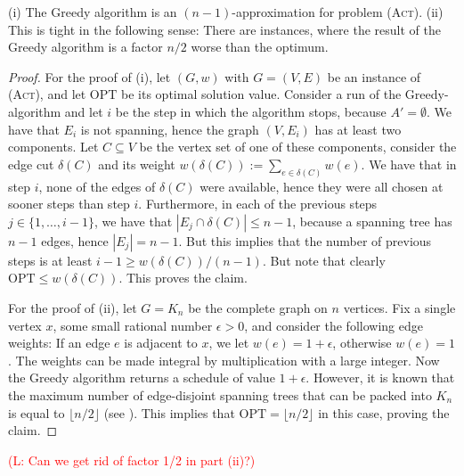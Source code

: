\documentclass[runningheads]{llncs}
\numberwithin{equation}{section}
\newcommand{\set}[1]{\{ #1 \}}
\newcommand{\fromto}[2]{\set{#1, \ldots, #2}}
\newcommand{\comment}[1]{\textcolor{red}{(L: #1)}}
\newcommand{\act}{\textsc{(Act)}}
\begin{document}
\begin{theorem}
(i) The Greedy algorithm is an $(n-1)$-approximation for problem \act.
(ii) This is tight in the following sense: There are instances, where the result of the Greedy algorithm is a factor $n/2$ worse than the optimum.
\end{theorem}
\begin{proof}
For the proof of (i), let $(G, w)$ with $G = (V, E)$ be an instance of \act, and let $\text{OPT}$ be its optimal solution value. Consider a run of the Greedy-algorithm and let $i$ be the step in which the algorithm stops, because $A' = \emptyset$. We have that $E_i$ is not spanning, hence the graph $(V, E_i)$ has at least two components. Let $C \subseteq V$ be the vertex set of one of these components, consider the edge cut $\delta(C)$ and its weight $w(\delta(C)) := \sum_{e \in \delta(C)}w(e)$. We have that in step $i$, none of the edges of $\delta(C)$ were available, hence they were all chosen at sooner steps than step $i$. Furthermore, in each of the previous steps $j \in \fromto{1}{i-1}$, we have that $|E_j \cap \delta(C)| \leq n-1$, because a spanning tree has $n-1$ edges, hence $|E_j| = n-1$. But this implies that the number of previous steps is at least $i - 1 \geq w(\delta(C)) / (n-1)$. But note that clearly   $\text{OPT} \leq w(\delta(C))$. This proves the claim.

For the proof of (ii), let $G = K_n$ be the complete graph on $n$ vertices. Fix a single vertex $x$, some small rational number $\epsilon > 0$, and consider the following edge weights: If an edge $e$ is adjacent to $x$, we let $w(e) = 1 + \epsilon$, otherwise $w(e) = 1$. The weights can be made integral by multiplication with a large integer. Now the Greedy algorithm returns a schedule of value $1 + \epsilon$. However, it is known that the maximum number of edge-disjoint spanning trees that can be packed into $K_n$ is equal to $\lfloor n/2 \rfloor$ (see \cite{SPTpackingSurvey}). This implies that $\text{OPT} = \lfloor n/2 \rfloor$ in this case, proving the claim.  
\end{proof}
\comment{Can we get rid of factor 1/2 in part (ii)?}
\end{document}
